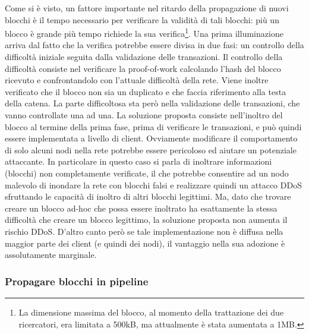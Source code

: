 Come si è visto, un fattore importante nel ritardo della propagazione di nuovi blocchi è il tempo necessario per verificare la validità di tali blocchi: più un blocco è grande più tempo richiede la sua verifica\footnote{La dimensione massima del blocco, al momento della trattazione dei due ricercatori, era limitata a 500kB, ma attualmente è stata aumentata a 1MB.}.
Una prima illuminazione arriva dal fatto che la verifica potrebbe essere divisa in due fasi: un controllo della difficoltà iniziale seguita dalla validazione delle transazioni.
Il controllo della difficoltà consiste nel verificare la proof-of-work calcolando l'hash del blocco ricevuto e confrontandolo con l'attuale difficoltà della rete. Viene inoltre verificato che il blocco non sia un duplicato e che faccia riferimento alla testa della catena.
La parte difficoltosa sta però nella validazione delle transazioni, che vanno controllate una ad una.
La soluzione proposta consiste nell'inoltro del blocco al termine della prima fase, prima di verificare le transazioni, e può quindi essere implementata a livello di client. Ovviamente modificare il comportamento di solo alcuni nodi nella rete potrebbe essere pericoloso ed aiutare un potenziale attaccante. In particolare in questo caso si parla di inoltrare informazioni (blocchi) non completamente verificate, il che potrebbe consentire ad un nodo malevolo di inondare la rete con blocchi falsi e realizzare quindi un attacco DDoS sfruttando le capacità di inoltro di altri blocchi legittimi.
Ma, dato che trovare creare un blocco ad-hoc che possa essere inoltrato ha esattamente la stessa difficoltà che creare un blocco legittimo, la soluzione proposta non aumenta il rischio DDoS.
D'altro canto però se tale implementazione non è diffusa nella maggior parte dei client (e quindi dei nodi), il vantaggio nella sua adozione è assolutamente marginale.

\subsubsection{Propagare blocchi in pipeline}

